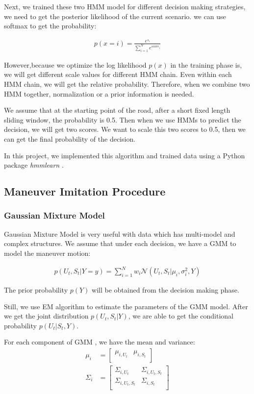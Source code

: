 \documentclass[conference]{IEEEtran}
\begin{document}
Next, we trained these two HMM model for different decision making strategies, we need to get the posterior likelihood of the current scenario. we can use softmax to get the probability: 

\begin{align}
p(x = i)  = \frac{e^{s_i}}{\sum_{i = 1}^{N}{e^{score_i}}}
\end{align}

However,because we optimize the log likelihood $p(x)$ in the training phase is, we will get different scale values for different HMM chain. Even within each HMM chain, we will get the relative probability. Therefore, when we combine two HMM together, normalization or a prior information is needed.

We assume that at the starting point of the road, after a short fixed length sliding window, the probability is 0.5. Then when we use HMMs to predict the decision, we will get two scores. We want to scale this two scores to 0.5, then we can get the final probability of the decision.


In this project, we implemented this algorithm and trained data using a Python package \textit{hmmlearn} \cite{hmm4}. 
\subsection{Maneuver Imitation Procedure}
\subsubsection{Gaussian Mixture Model}
Gaussian Mixture Model is very useful with data which has multi-model and complex structures. We assume that under each decision, we have a GMM to model the maneuver motion:

\begin{align}
p(U_{t}, S_{t} | Y = y) = \sum_{i = 1}^{N}{w_i\mathcal{N}(U_{t}, S_{t} | \mu_{i}, \sigma_{i}^{2}, Y)}
\end{align}

The prior probability $p(Y)$ will be obtained from the decision making phase.

Still, we use EM algorithm to estimate the parameters of the GMM model. After we get the joint distribution $p(U_{t}, S_{t} | Y)$, we are able to get the conditional probability $p(U_{t} | S_{t}, Y)$.

For each component of GMM , we have the mean and variance:
\begin{align}
\mu_{i}&=
\begin{bmatrix}
\mu_{i, U_{t}} &\mu_{i, S_{t}}\\
\end{bmatrix}\\
\Sigma_{i}&=
\begin{bmatrix}
\Sigma_{i, U_{t}} & \Sigma_{i, U_{t}, S_{t}}\\
\Sigma_{i, U_{t}, S_{t}} & \Sigma_{i, S_{t}}\\
\end{bmatrix}
\end{align}
\end{document}

